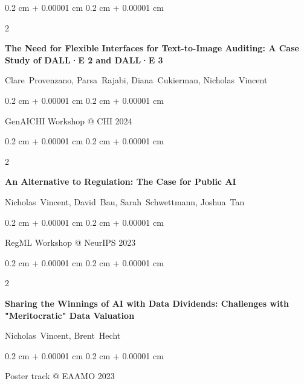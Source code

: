 \documentclass[10pt, letterpaper]{article}
\newenvironment{onecolentry}{
    \begin{adjustwidth}{
        0.2 cm + 0.00001 cm
    }{
        0.2 cm + 0.00001 cm
    }
}{
    \end{adjustwidth}
} %
\newenvironment{twocolentry}[2][]{
    \onecolentry
    \def\secondColumn{#2}
    \setcolumnwidth{\fill, 4.1 cm}
    \begin{paracol}{2}
}{
    \switchcolumn \raggedleft \secondColumn
    \end{paracol}
    \endonecolentry
} %
\begin{document}
        \begin{samepage}
            \begin{twocolentry}{
                2024
            }
                \textbf{The Need for Flexible Interfaces for Text-to-Image Auditing: A Case Study of DALL·E 2 and DALL·E 3}

                \vspace{0.10 cm}

                \mbox{Clare Provenzano}, \mbox{Parsa Rajabi}, \mbox{Diana Cukierman}, \mbox{Nicholas Vincent}
            \end{twocolentry}


            \vspace{0.10 cm}

            \begin{onecolentry}
        GenAICHI Workshop @ CHI 2024    \end{onecolentry}
        \end{samepage}

        \vspace{0.2 cm}

        \begin{samepage}
            \begin{twocolentry}{
                2023
            }
                \textbf{An Alternative to Regulation: The Case for Public AI}

                \vspace{0.10 cm}

                \mbox{Nicholas Vincent}, \mbox{David Bau}, \mbox{Sarah Schwettmann}, \mbox{Joshua Tan}
            \end{twocolentry}


            \vspace{0.10 cm}

            \begin{onecolentry}
        RegML Workshop @ NeurIPS 2023    \end{onecolentry}
        \end{samepage}

        \vspace{0.2 cm}

        \begin{samepage}
            \begin{twocolentry}{
                2023
            }
                \textbf{Sharing the Winnings of AI with Data Dividends: Challenges with "Meritocratic" Data Valuation}

                \vspace{0.10 cm}

                \mbox{Nicholas Vincent}, \mbox{Brent Hecht}
            \end{twocolentry}


            \vspace{0.10 cm}

            \begin{onecolentry}
        Poster track @ EAAMO 2023    \end{onecolentry}
        \end{samepage}
\end{document}
